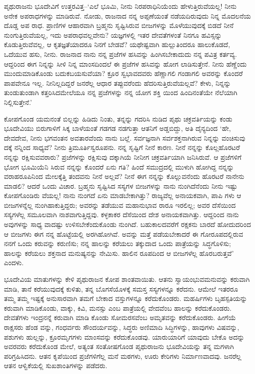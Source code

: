 ಪೃಥುರಾಜನು ಭೂದೇವಿಗೆ ಉತ್ತರವಿತ್ತ–‘ಎಲೆ ಭೂಮಿ, ನೀನು ನಿರಪರಾಧಿನಿಯೆಂದು ಹೇಳುತ್ತಿರುವೆಯಲ್ಲ! ನೀನು ಅನೇಕ ಅಪರಾಧಗಳನ್ನು ಮಾಡಿರುವೆ. ನೋಡು, ರಾಜನಾದ ನನ್ನ ಅಪ್ಪಣೆಯಂತೆ ನಡೆಯದಿರುವುದು ನಿನ್ನ ಮೊದಲನೆಯ ದೊಡ್ಡ ಅಪ ರಾಧ. ಪ್ರಾಣಿಗಳ ಆಹಾರವಾಗಿ ಬ್ರಹ್ಮನು ಸೃಷ್ಟಿಸಿರುವ ಬೀಜಗಳನ್ನು ಮೊಳೆಯುವುದಕ್ಕೆ ಬಿಡದೆ ನೀನೆ ನುಂಗುತ್ತಿರುವೆಯಲ್ಲ, ಇದು ಅಪರಾಧವಲ್ಲವೇನು? ಯಜ್ಞಗಳಲ್ಲಿ ಇತರ ದೇವತೆಗಳಂತೆ ನಿನಗೂ ಹವಿಸ್ಸನ್ನು ಕೊಡುತ್ತಿರುವೆವಲ್ಲ, ಆ ಕೃತಜ್ಞತೆಯಾದರೂ ನಿನಗೆ ಬೇಡವೆ? ಯಥೇಷ್ಟವಾಗಿ ಹುಲ್ಲುತಿಂದರೂ ಹಾಲುಕೊಡದೆ, ಒದೆಯುವ ಹಸು, ನೀನು. ರಾಜನಾದ ನಾನು ನನ್ನ ಪ್ರಜೆಗಳ ಹಸಿವನ್ನು ಹಿಂಗಿಸಬೇಕಾದುದು ನನ್ನ ಪವಿತ್ರ ಕರ್ತವ್ಯ. ಆದ್ದರಿಂದ ಈಗ ನಿನ್ನನ್ನು ಸೀಳಿ ನಿನ್ನ ಮಾಂಸದಿಂದಲೆ ಈ ಪ್ರಜೆಗಳ ಹಸಿವನ್ನು ಹೋಗ ಲಾಡಿಸುತ್ತೇನೆ. ನೀನು ಹೆಣ್ಣೆಂದು ಮುಂದುಮಾಡಿಕೊಂಡು ಬದುಕಬಯಸುವೆಯಾ? ಕ್ರೂರ ಸ್ವಭಾವದವರು ಹೆಣ್ಣಾಗಲಿ ಗಂಡಾಗಲಿ ಅವರನ್ನು ಕೊಂದರೆ ಪಾಪವೇನೂ ಇಲ್ಲ. ನೀನಿಲ್ಲದಿದ್ದರೆ ಜನರೆಲ್ಲ ಆಧಾರ ತಪ್ಪುವರೆಂದು ಹೆದರಿಸುತ್ತಿರುವೆಯಲ್ಲವೆ? ಕೇಳು, ನಿನ್ನನ್ನು ತುಂಡುತುಂಡಾಗಿ ಕತ್ತರಿಸಿದಮೇಲೆಯೂ ನನ್ನ ಪ್ರಜೆಗಳನ್ನು ನನ್ನ ಯೋಗ ಶಕ್ತಿ ಯಿಂದ ಹಿಂದಿನಂತೆಯೇ ನೆಲೆಯಾಗಿ ನಿಲ್ಲಿಸುತ್ತೇನೆ.’

ಕೋಪಗೊಂಡ ಯಮನಂತೆ ಬಿಲ್ಲನ್ನು ಹಿಡಿದು ನಿಂತು, ತನ್ನನ್ನು ಗದರಿಸಿ ನುಡಿದ ಪೃಥು ಚಕ್ರವರ್ತಿಯನ್ನು ಕಂಡು ಭೂದೇವಿಯು ಬಿರುಗಾಳಿಗೆ ಸಿಕ್ಕ ಬಾಳೆಯಂತೆ ಗಡಗಡ ನಡಗುತ್ತಾ ಆತನಿಗೆ ಅಡ್ಡಬಿದ್ದು, ಅತಿ ದೈನ್ಯದಿಂದ ‘ಹೇ, ದೇವದೇವ, ನೀನು ಭಗವಂತನ ಅವತಾರವೆಂದು ನಾನು ಬಲ್ಲೆ. ಸರ್ವಜ್ಞನಾಗಿ ಸರ್ವಶಕ್ತನಾಗಿರುವ ನಿನ್ನನ್ನು ವಂಚಿಸುವು ದಕ್ಕೆ ನನ್ನಿಂದ ಸಾಧ್ಯವೆ? ನೀನು ತ್ರಿಮೂರ್ತಿಸ್ವರೂಪನು. ನನ್ನ ಸೃಷ್ಟಿಗೆ ನೀನೆ ಕಾರಣ. ನೀನೆ ನನ್ನನ್ನು ಕೊಲ್ಲಹೊರಟರೆ ನನ್ನನ್ನು ರಕ್ಷಿಸುವವರಾರು? ಪ್ರಜೆಗಳನ್ನು ರಕ್ಷಿಸುವು ದಕ್ಕಾಗಿಯೆ ನೀನೀಗ ಚಕ್ರವರ್ತಿಯಾಗಿ ಜನಿಸಿರುವೆ. ಆ ಪ್ರಜೆಗಳಿಗೆ ಭೋಗ ಭೂಮಿಯೆನಿ ಸಿರುವ ನನ್ನನ್ನು ಕೊಂದರೆ ಏನು ಗತಿ? ಹಿಂದೆ ಸಮುದ್ರದಲ್ಲಿ ಮುಳುಗಿ ಹೋಗಿದ್ದ ನನ್ನನ್ನು ವರಾಹರೂಪಿನಿಂದ ಮೇಲಕ್ಕೆತ್ತಿ ತಂದವನು ನೀನೆ ಅಲ್ಲವೆ? ನೀನೆ ಈಗ ನನ್ನನ್ನು ಕೊಲ್ಲುವನೆಂದು ಹೊರಟರೆ ನಾನೇನು ಮಾಡಲಿ? ಆದರೆ ಒಂದು ವಿಚಾರ. ಬ್ರಹ್ಮನು ಸೃಷ್ಟಿಸಿದ ಸಸ್ಯಗಳ ಬೀಜಗಳನ್ನು ನಾನು ನುಂಗಿದೆನೆಂದು ನೀನು ಇಷ್ಟು ಕೋಪಗೊಂಡಿರು ವೆಯಲ್ಲ! ನಾನು ನುಂಗದೆ ಏನು ಮಾಡಬೇಕಾಗಿತ್ತು? ರಾಜ್ಯವೆಲ್ಲ ಅನಾಯಕವಾಗಿ, ಪಾಪಿ ಗಳು ಆ ಬೀಜಗಳನ್ನೆಲ್ಲ ನುಂಗಿಹಾಕುತ್ತಿದ್ದರು; ಅವರನ್ನು ತಡೆಯುವ ಮಹಾನುಭಾವ ರಾರೂ ಇರಲಿಲ್ಲ; ಅವರ ದೆಸೆಯಿಂದ ಸಸ್ಯಗಳೆಲ್ಲ ಸಮೂಲವಾಗಿ ನಾಶವಾಗುತ್ತಿದ್ದವು. ಕಳ್ಳಕಾಕರ ದೆಸೆಯಿಂದ ದೇಶ ಅನಾಯಕವಾಗಿತ್ತು. ಆದ್ದರಿಂದ ನಾನು ಅವುಗಳನ್ನು ಸಾಧ್ಯ ವಾದಷ್ಟು ಉಳಿಸಬೇಕೆಂದುಕೊಂಡು ನುಂಗಿದೆ. ಬಹುಕಾಲದವರೆಗೆ ರಕ್ಷಕನು ಬಾರದೆ ಹೋದುದರಿಂದ ಆ ಬೀಜಗಳು ಈಗ ನನ್ನ ಹೊಟ್ಟೆಯಲ್ಲಿ ಅರಗಿಹೋಗಿವೆ. ಅವನ್ನು ಮತ್ತೆ ಪಡೆಯಬೇಕಾದರೆ ಈ ಗೋರೂಪದಲ್ಲಿರುವ ನನಗೆ ಒಂದು ಕರುವನ್ನು ಕರುಣಿಸು; ನನ್ನ ಹಾಲನ್ನು ಕರೆಯಲು ತಕ್ಕುದಾದ ಒಂದು ಪಾತ್ರೆಯನ್ನು ಸಿದ್ಧಗೊಳಿಸು; ಹಾಲನ್ನು ಕರೆಯಲು ಶಕ್ತನಾದ ಮನುಷ್ಯನನ್ನು ನೇಮಿಸು. ಹಾಲಿನ ರೂಪದಿಂದ ಆ ಬೀಜಗಳೆಲ್ಲ ಹೊರಬರುತ್ತವೆ’ ಎಂದಳು.

ಭೂದೇವಿಯ ಮಾತುಗಳನ್ನು ಕೇಳಿ ಪೃಥುರಾಜನ ಕೋಪ ಶಾಂತವಾಯಿತು. ಆತನು ಸ್ವಾಯಂಭುವಮನುವನ್ನು ಕರುವಾಗಿ ಮಾಡಿ, ತಾನೆ ಕರೆಯುವುದಕ್ಕೆ ಕುಳಿತು, ತನ್ನ ಬೊಗಸೆಯೊಳಕ್ಕೆ ಸಮಸ್ತ ಸಸ್ಯಗಳನ್ನೂ ಕರೆದನು. ಆಮೇಲೆ ಇತರರೂ ತಮ್ಮ ತಮ್ಮ ಇಷ್ಟಕ್ಕೆ ಅನುಸಾರವಾಗಿ ತಮಗೆ ಬೇಕಾದ ವಸ್ತುಗಳನ್ನೂ ಕರೆದುಕೊಂಡರು. ಮಹರ್ಷಿಗಳು ಬೃಹಸ್ಪತಿಯನ್ನು ಕರುವಾಗಿ ಮಾಡಿಕೊಂಡು, ವಾಕ್ಕು, ಕಿವಿ, ಮನಸ್ಸು ಎಂಬ ಪಾತ್ರೆಯಲ್ಲಿ ವೇದವೆಂಬ ಹಾಲನ್ನು ಕರೆದುಕೊಂಡರು. ದೇವತೆಗಳು ಇಂದ್ರನನ್ನೆ ಕರುವಾಗಿ ಮಾಡಿ ಕೊಂಡು ಸೋಮರಸವೆಂಬ ಅಮೃತವನ್ನು ಕರೆದುಕೊಂಡರು. ಹೀಗೆಯೆ ರಾಕ್ಷಸರು ಹೆಂಡ ವನ್ನು, ಗಂಧರ್ವರು ಸೌಂದರ್ಯವನ್ನು, ಸಿದ್ಧರು ಅಣಿಮಾದಿ ಸಿದ್ಧಿಗಳನ್ನು, ಹಾವುಗಳು ವಿಷವನ್ನು, ಪಶುಗಳು ಹುಲ್ಲನ್ನು, ಕ್ರೂರಮೃಗಗಳು ಮಾಂಸವನ್ನು ಕರೆದುಕೊಂಡವು. ಯಾರುಯಾರಿಗೆ ಯಾವುದು ಬೇಕೊ ಅದನ್ನು ಅವರವರು ಕರೆದುಕೊಂಡ ಮೇಲೆ, ಅತ್ಯಂತ ಸಂತೋಷಗೊಂಡ ಪೃಥುರಾಜನು ಭೂದೇವಿಯನ್ನು ತನ್ನ ಮಗಳಾಗಿ ಪರಿಗ್ರಹಿಸಿದನು. ಆತನ ಕೃಪೆಯಿಂದ ಪ್ರಜೆಗಳಿಗೆಲ್ಲ ಮನೆ ಮಠಗಳು, ಊರು ಕೇರಿಗಳು ನಿರ್ಮಾಣವಾದವು. ಜನರೆಲ್ಲ ಆತನ ಆಳ್ವಿಕೆಯಲ್ಲಿ ಸುಖಶಾಂತಿಗಳನ್ನು ಪಡೆದರು.

